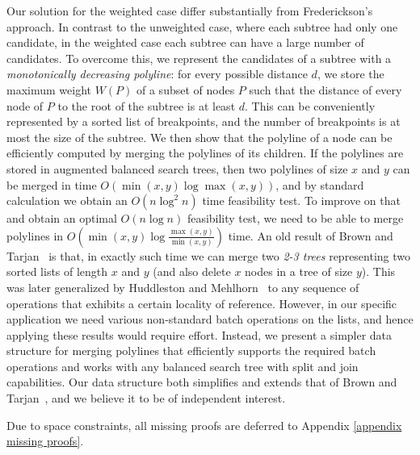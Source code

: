 \documentclass[a4paper,UKenglish]{lipics-v2016}
\theoremstyle{plain}
\newcommand{\Oh}{{O}}
\begin{document}
\medskip {}
Our solution for the weighted case differ substantially from Frederickson's approach.
In contrast to the unweighted case, where each subtree had only one candidate, in the weighted case each subtree can have a large number of candidates. 
  To overcome this, we represent the candidates of a subtree with a {\em monotonically decreasing polyline}:
for every possible distance $d$, we store the maximum weight $W(P)$ of a subset of nodes $P$ such that the distance of every node of $P$ to the root of the subtree is at least $d$.
This can be conveniently represented by a sorted list of breakpoints, and the number of breakpoints is at most
the size of the subtree. We then show that the polyline of a node can be efficiently computed by merging the polylines of its children. If the polylines
are stored in augmented balanced search trees, then two polylines of size $x$ and $y$ can be merged in time $\Oh(\min(x,y)\log\max(x,y))$,
and by standard calculation we obtain an $\Oh(n\log^{2}n)$ time feasibility test. To improve on that and obtain an optimal $\Oh(n\log n)$ feasibility test,
we need to be able to merge polylines in $\Oh(\min(x,y)\log\frac{\max(x,y)}{\min(x,y)})$ time. 
An old result of Brown and Tarjan~\cite{Brown1980} is that, in exactly such time we can merge two {\em 2-3 trees} representing two sorted lists of length $x$ and $y$ (and also delete $x$ nodes in a tree of size $y$). This was later generalized by Huddleston and
Mehlhorn~\cite{huddlestonM82} to any sequence of operations that exhibits a certain locality of reference. However, in our specific
application we need various non-standard batch operations on the lists, and hence applying these results would require effort.
Instead, we present a simpler data structure for merging polylines that efficiently supports the required batch operations and works with %
any balanced search tree with split and join capabilities. Our data structure both simplifies and extends that of Brown and Tarjan~\cite{Brown1980}, and we believe it to be of independent interest. 

Due to space constraints, all  missing proofs are deferred to Appendix \ref{appendix missing proofs}.
\end{document}
